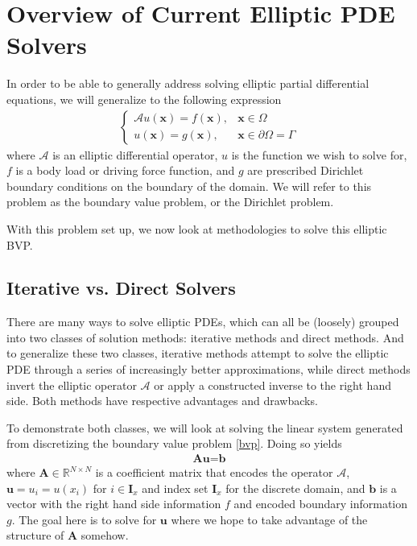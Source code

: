 \section{Overview of Current Elliptic PDE Solvers}

In order to be able to generally address solving elliptic partial differential equations, we will generalize to the following expression
\begin{align}
    \begin{cases}
        \mathcal{A} u(\textbf{x}) = f(\textbf{x}), &\textbf{x} \in \Omega \\
        u(\textbf{x}) = g(\textbf{x}), &\textbf{x} \in \partial \Omega = \Gamma
    \end{cases}
    \label{bvp}
\end{align}
where $\mathcal{A}$ is an elliptic differential operator, $u$ is the function we wish to solve for, $f$ is a body load or driving force function, and $g$ are prescribed Dirichlet boundary conditions on the boundary of the domain. We will refer to this problem as the boundary value problem, or the Dirichlet problem.

With this problem set up, we now look at methodologies to solve this elliptic BVP.

\subsection{Iterative vs. Direct Solvers}

There are many ways to solve elliptic PDEs, which can all be (loosely) grouped into two classes of solution methods: iterative methods and direct methods. And to generalize these two classes, iterative methods attempt to solve the elliptic PDE through a series of increasingly better approximations, while direct methods invert the elliptic operator $\mathcal{A}$ or apply a constructed inverse to the right hand side. Both methods have respective advantages and drawbacks.

To demonstrate both classes, we will look at solving the linear system generated from discretizing the boundary value problem \ref{bvp}. Doing so yields
\begin{align}
\textbf{A} \textbf{u} = \textbf{b}
\end{align}
where $\textbf{A} \in \mathbb{R}^{N \times N}$ is a coefficient matrix that encodes the operator $\mathcal{A}$, $\textbf{u} = u_i = u(x_i)$ for $i \in \textbf{I}_x$ and index set $\textbf{I}_x$ for the discrete domain, and $\textbf{b}$ is a vector with the right hand side information $f$ and encoded boundary information $g$. The goal here is to solve for $\textbf{u}$ where we hope to take advantage of the structure of $\textbf{A}$ somehow.

